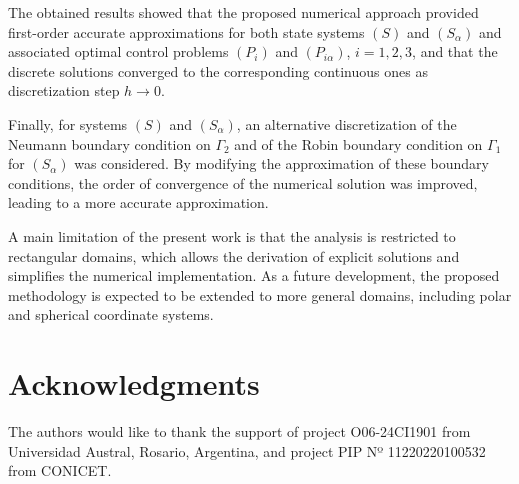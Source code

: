 \documentclass[11pt]{article}
\begin{document}
\begin{flushleft}
The obtained results showed that the proposed numerical approach provided first-order accurate approximations for both state systems $(S)$ and $(S_\alpha)$ and associated optimal control problems $(P_i)$ and $(P_{i\alpha})$, $i=1,2,3$, and that the discrete solutions converged to the corresponding continuous ones as discretization step $h \to 0$.



Finally, for systems $(S)$ and $(S_\alpha)$, an alternative discretization of the Neumann boundary condition on $\Gamma_2$ and of the Robin boundary condition on $\Gamma_1$ for $(S_\alpha)$ was considered. By modifying the approximation of these boundary conditions, the order of convergence of the numerical solution was improved, leading to a more accurate approximation.



A main limitation of the present work is that the analysis is restricted to rectangular domains, which allows the derivation of explicit solutions and simplifies the numerical implementation. As a future development, the proposed methodology is expected to be extended to more general domains, including polar and spherical coordinate systems.










%
%
 


\section*{Acknowledgments}
The authors would like to thank the support of project O06-24CI1901 from Universidad Austral, Rosario, Argentina, and project PIP Nº 11220220100532 from CONICET.





\end{flushleft}
\end{document}
